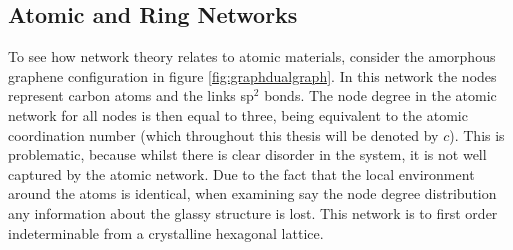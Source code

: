 \subsection{Atomic and Ring Networks}
\label{s:atomringnetworks}

To see how network theory relates to atomic materials, consider the amorphous graphene configuration in figure \ref{fig:graphdualgraph}.
In this network the nodes represent carbon atoms and the links sp$^2$ bonds.
The node degree in the atomic network for all nodes is then equal to three, being equivalent to the atomic coordination number (which throughout this thesis will be denoted by $c$).
This is problematic, because whilst there is clear disorder in the system, it is not well captured by the atomic network.
Due to the fact that the local environment around the atoms is identical, when examining say the node degree distribution any information about the glassy structure is lost.
This network is to first order indeterminable from a crystalline hexagonal lattice.

